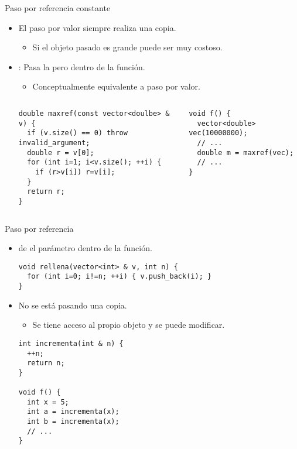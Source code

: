 \begin{frame}[fragile]{Paso por referencia constante}
\begin{itemize}
  \item El paso por valor siempre realiza una copia.
    \begin{itemize}
      \item Si el objeto pasado es grande puede ser muy costoso.
    \end{itemize}
  \item {}: 
        Pasa la  pero 
         dentro de la función.
    \begin{itemize}
      \item Conceptualmente equivalente a paso por valor.
    \end{itemize}
\begin{columns}[T]
\begin{lstlisting}
double maxref(const vector<doulbe> & v) {
  if (v.size() == 0) throw invalid_argument;
  double r = v[0];
  for (int i=1; i<v.size(); ++i) {
    if (r>v[i]) r=v[i];
  }
  return r;
}
\end{lstlisting}

\begin{lstlisting}
void f() {
  vector<double> vec(10000000);
  // ...
  double m = maxref(vec);
  // ...
}
\end{lstlisting}
\end{columns}
\end{itemize}
\end{frame}

\begin{frame}[fragile]{Paso por referencia}
\begin{itemize}
  \item {} de  
        el parámetro dentro de la función.
\begin{lstlisting}
void rellena(vector<int> & v, int n) {
  for (int i=0; i!=n; ++i) { v.push_back(i); }
}
\end{lstlisting}
  \item No se está pasando una copia.
    \begin{itemize}
      \item Se tiene acceso al propio objeto y se puede modificar.
    \end{itemize}
\begin{lstlisting}
int incrementa(int & n) {
  ++n;
  return n;
}

void f() {
  int x = 5;
  int a = incrementa(x);
  int b = incrementa(x);
  // ...
}
\end{lstlisting}
\end{itemize}
\end{frame}

